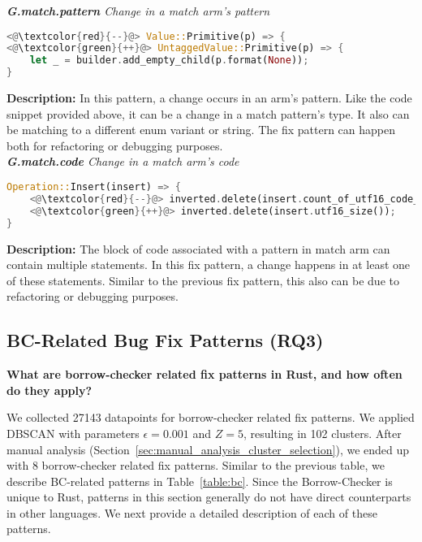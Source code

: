 \noindent\textit{\textbf{G.match.pattern} Change in a match arm's pattern}

\begin{lstlisting}[language=Rust, style=colouredRust]
<@\textcolor{red}{--}@> Value::Primitive(p) => {
<@\textcolor{green}{++}@> UntaggedValue::Primitive(p) => {
    let _ = builder.add_empty_child(p.format(None));
}
\end{lstlisting}

\noindent\textbf{Description:} In this pattern, a change occurs in an arm's pattern. Like the code snippet provided above, it can be a change in a match pattern's type. It also can be matching to a different enum variant or string. The fix pattern can happen both for refactoring or debugging purposes. \\

\noindent\textit{\textbf{G.match.code} Change in a match arm's code}

\begin{lstlisting}[language=Rust, style=colouredRust]
Operation::Insert(insert) => {
    <@\textcolor{red}{--}@> inverted.delete(insert.count_of_utf16_code_units());
    <@\textcolor{green}{++}@> inverted.delete(insert.utf16_size());
}
\end{lstlisting}

\noindent\textbf{Description:} The block of code associated with a pattern in match arm can contain multiple statements. In this fix pattern, a change happens in at least one of these statements. Similar to the previous fix pattern, this also can be due to refactoring or debugging purposes.

\subsection{\label{sec:bc_patterns}BC-Related Bug Fix Patterns (RQ3)}

\textbf{What are borrow-checker related fix patterns in Rust, and how often do they apply?} 

We collected 27143 datapoints for borrow-checker related fix patterns. We applied DBSCAN with parameters $\epsilon=0.001$ and $Z=5$, resulting in 102 clusters. After manual analysis (Section~\ref{sec:manual_analysis_cluster_selection}), we ended up with 8 borrow-checker related fix patterns. Similar to the previous table, we describe BC-related patterns in Table~\ref{table:bc}. Since the Borrow-Checker is unique to Rust, patterns in this section generally do not have direct counterparts in other languages. We next provide a detailed description of each of these patterns.


